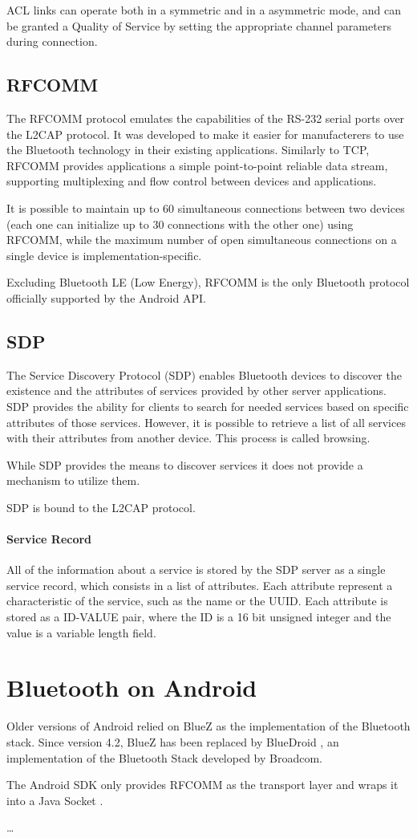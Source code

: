 ACL links can operate both in a symmetric and in a asymmetric mode, and can be granted a Quality of Service by setting the appropriate channel parameters during connection.

\subsection{RFCOMM}
The RFCOMM protocol \cite{RFCOMM} emulates the capabilities of the RS-232 serial ports over the L2CAP protocol. It was developed to make it easier for manufacterers to use the Bluetooth technology in their existing applications. Similarly to TCP, RFCOMM provides applications a simple point-to-point reliable data stream, supporting multiplexing and flow control between devices and applications.

It is possible to maintain up to 60 simultaneous connections between two devices (each one can initialize up to 30 connections with the other one) using RFCOMM, while the maximum number of open simultaneous connections on a single device is implementation-specific.

Excluding Bluetooth LE (Low Energy), RFCOMM is the only Bluetooth protocol officially supported by the Android API.

\subsection{SDP}
The Service Discovery Protocol (SDP) enables Bluetooth devices to discover the existence and the attributes of services provided by other server applications.
SDP provides the ability for clients to search for needed services based on specific attributes of those services. 
However, it is possible to retrieve a list of all services with their attributes from another device.
This process is called browsing.

While SDP provides the means to discover services it does not provide a mechanism to utilize them.

SDP is bound to the L2CAP protocol.

\paragraph{Service Record}
All of the information about a service is stored by the SDP server as a single service record, which consists in a list of attributes.
Each attribute represent a characteristic of the service, such as the name or the UUID. Each attribute is stored as a ID-VALUE pair, where the ID is a 16 bit unsigned integer and the value is a variable length field.


\section{Bluetooth on Android}
Older versions of Android relied on BlueZ \cite{bluez} as the implementation of the Bluetooth stack.
Since version 4.2, BlueZ has been replaced by BlueDroid \cite{bluedroid}, an implementation of the Bluetooth Stack developed by Broadcom. 

The Android SDK only provides RFCOMM as the transport layer \cite{android_rfcomm} and wraps it into a Java Socket \cite{android_rfcomm_java_socket}. 

\dots